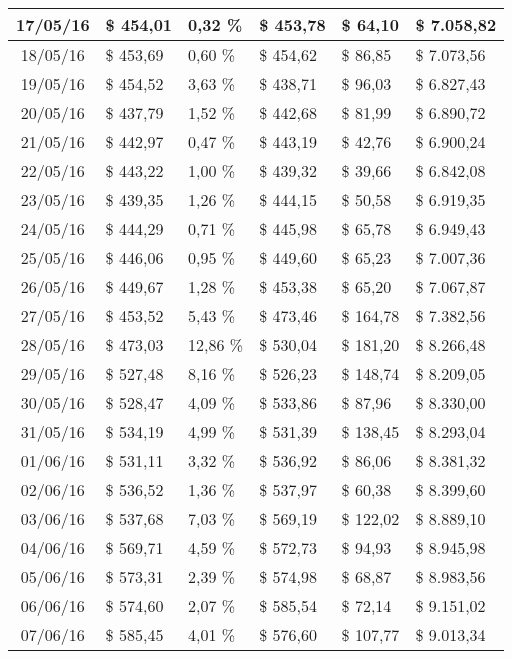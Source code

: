 \begin{small}
\begin{longtable}{|c|l|l|l|l|l|}
17/05/16 & \$ 454,01 & 0,32 \% & \$ 453,78 & \$ 64,10 & \$ 7.058,82 \\ \hline
18/05/16 & \$ 453,69 & 0,60 \% & \$ 454,62 & \$ 86,85 & \$ 7.073,56 \\ \hline
19/05/16 & \$ 454,52 & 3,63 \% & \$ 438,71 & \$ 96,03 & \$ 6.827,43 \\ \hline
20/05/16 & \$ 437,79 & 1,52 \% & \$ 442,68 & \$ 81,99 & \$ 6.890,72 \\ \hline
21/05/16 & \$ 442,97 & 0,47 \% & \$ 443,19 & \$ 42,76 & \$ 6.900,24 \\ \hline
22/05/16 & \$ 443,22 & 1,00 \% & \$ 439,32 & \$ 39,66 & \$ 6.842,08 \\ \hline
23/05/16 & \$ 439,35 & 1,26 \% & \$ 444,15 & \$ 50,58 & \$ 6.919,35 \\ \hline
24/05/16 & \$ 444,29 & 0,71 \% & \$ 445,98 & \$ 65,78 & \$ 6.949,43 \\ \hline
25/05/16 & \$ 446,06 & 0,95 \% & \$ 449,60 & \$ 65,23 & \$ 7.007,36 \\ \hline
26/05/16 & \$ 449,67 & 1,28 \% & \$ 453,38 & \$ 65,20 & \$ 7.067,87 \\ \hline
27/05/16 & \$ 453,52 & 5,43 \% & \$ 473,46 & \$ 164,78 & \$ 7.382,56 \\ \hline
28/05/16 & \$ 473,03 & 12,86 \% & \$ 530,04 & \$ 181,20 & \$ 8.266,48 \\ \hline
29/05/16 & \$ 527,48 & 8,16 \% & \$ 526,23 & \$ 148,74 & \$ 8.209,05 \\ \hline
30/05/16 & \$ 528,47 & 4,09 \% & \$ 533,86 & \$ 87,96 & \$ 8.330,00 \\ \hline
31/05/16 & \$ 534,19 & 4,99 \% & \$ 531,39 & \$ 138,45 & \$ 8.293,04 \\ \hline
01/06/16 & \$ 531,11 & 3,32 \% & \$ 536,92 & \$ 86,06 & \$ 8.381,32 \\ \hline
02/06/16 & \$ 536,52 & 1,36 \% & \$ 537,97 & \$ 60,38 & \$ 8.399,60 \\ \hline
03/06/16 & \$ 537,68 & 7,03 \% & \$ 569,19 & \$ 122,02 & \$ 8.889,10 \\ \hline
04/06/16 & \$ 569,71 & 4,59 \% & \$ 572,73 & \$ 94,93 & \$ 8.945,98 \\ \hline
05/06/16 & \$ 573,31 & 2,39 \% & \$ 574,98 & \$ 68,87 & \$ 8.983,56 \\ \hline
06/06/16 & \$ 574,60 & 2,07 \% & \$ 585,54 & \$ 72,14 & \$ 9.151,02 \\ \hline
07/06/16 & \$ 585,45 & 4,01 \% & \$ 576,60 & \$ 107,77 & \$ 9.013,34 \\ \hline

\end{longtable}
\end{small}
